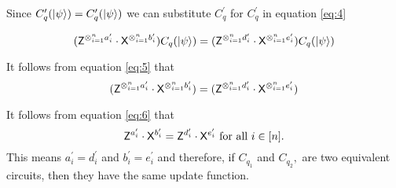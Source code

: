 \begin{flushleft}
Since $C_q^\prime({\lvert}\psi\rangle)=C_q^\prime({\lvert}\psi\rangle)$ we can substitute $C_q^\prime$ for $C_q^\prime$ in equation \ref{eq:4}

\begin{equation}
  \label{eq:5}
({\sf Z}^{\otimes_{i=1}^{n} a_{i}^\prime} \cdot {\sf X}^{\otimes_{i=1}^{n} b_{i}^\prime})C_q({\lvert}\psi\rangle)=({\sf Z}^{\otimes_{i=1}^{n} d_{i}^\prime} \cdot {\sf X}^{\otimes_{i=1}^{n} e_{i}^\prime})C_q({\lvert}\psi\rangle)
\end{equation}

It follows from equation \ref{eq:5} that 
\begin{equation}
  \label{eq:6}
({\sf Z}^{\otimes_{i=1}^{n} a_{i}^\prime} \cdot {\sf X}^{\otimes_{i=1}^{n} b_{i}^\prime})=({\sf Z}^{\otimes_{i=1}^{n} d_{i}^\prime} \cdot {\sf X}^{\otimes_{i=1}^{n} e_{i}^\prime})
\end{equation}

It follows from equation \ref{eq:6}  that $${\sf Z}^{a_i^\prime} \cdot {\sf X}^{b_i^\prime}={\sf Z}^{d_i^\prime} \cdot {\sf X}^{e_i^\prime} \mbox{ for all } i\in[n].$$ This means $a_i^\prime=d_i^\prime$ and  $b_i^\prime=e_i^\prime$ and therefore, if $C_{q_1}$ and $C_{q_2},$ are two equivalent circuits, then they have the same update function.

\end{flushleft}





%
%
%
%


